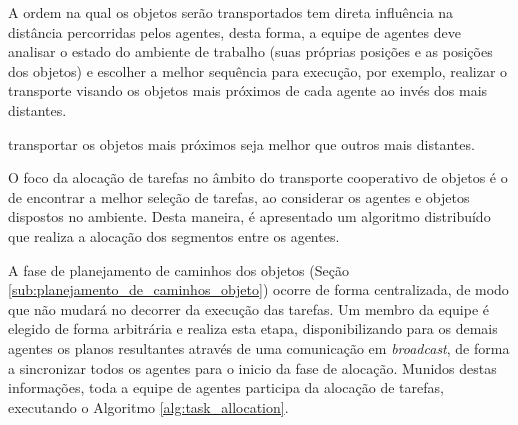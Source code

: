 A ordem na qual os objetos serão transportados tem direta influência na distância percorridas pelos agentes, desta forma, a equipe de agentes deve analisar o estado do ambiente de trabalho (suas próprias posições e as posições dos objetos) e escolher a melhor sequência para execução, por exemplo, realizar o transporte visando os objetos mais próximos de cada agente ao invés dos mais distantes.

transportar os objetos mais próximos seja melhor que outros mais distantes.

O foco da alocação de tarefas no âmbito do transporte cooperativo de objetos é o de encontrar a melhor seleção de tarefas, ao considerar os agentes e objetos dispostos no ambiente.
Desta maneira, é apresentado um algoritmo distribuído que realiza a alocação dos segmentos entre os agentes.

A fase de planejamento de caminhos dos objetos (Seção \ref{sub:planejamento_de_caminhos_objeto}) ocorre de forma centralizada, de modo que não mudará no decorrer da execução das tarefas.
Um membro da equipe é elegido de forma arbitrária e realiza esta etapa, disponibilizando para os demais agentes os planos resultantes através de uma comunicação em \emph{broadcast}, de forma a sincronizar todos os agentes para o inicio da fase de alocação.
Munidos destas informações, toda a equipe de agentes participa da alocação de tarefas, executando o Algoritmo \ref{alg:task_allocation}.

